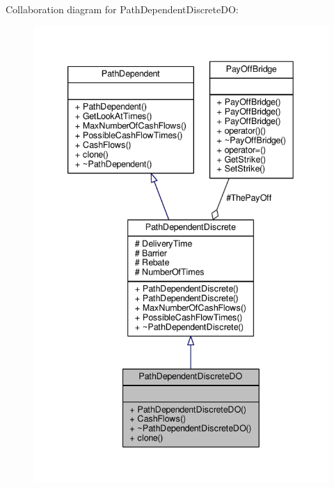 Collaboration diagram for Path\+Dependent\+Discrete\+DO\+:
\nopagebreak
\begin{figure}[H]
\begin{center}
\leavevmode
\includegraphics[width=340pt]{classPathDependentDiscreteDO__coll__graph}
\end{center}
\end{figure}
